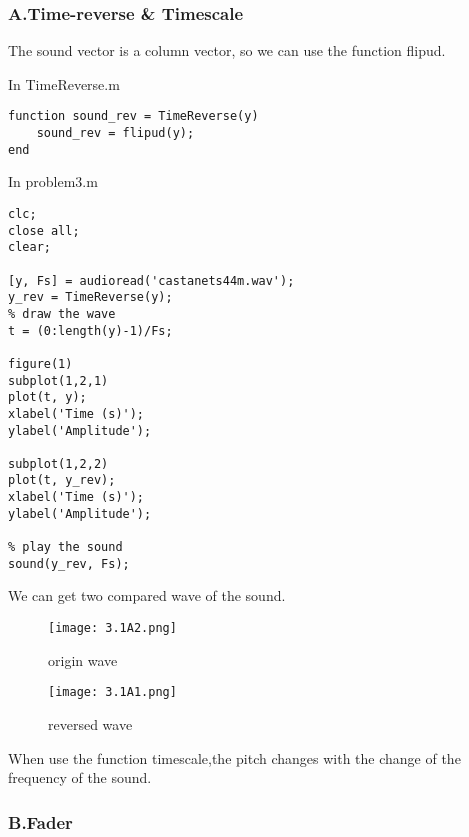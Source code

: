 \documentclass{article}
\begin{document}
\subsubsection*{A.Time-reverse \& Timescale}
The sound vector is a column vector, 
so we can use the function flipud.\par
In TimeReverse.m
\begin{lstlisting}
function sound_rev = TimeReverse(y)
    sound_rev = flipud(y);
end
\end{lstlisting}
In problem3.m
\begin{lstlisting}
clc;
close all;
clear;

[y, Fs] = audioread('castanets44m.wav');
y_rev = TimeReverse(y);
% draw the wave
t = (0:length(y)-1)/Fs;

figure(1)
subplot(1,2,1)
plot(t, y);
xlabel('Time (s)');
ylabel('Amplitude');

subplot(1,2,2)
plot(t, y_rev);
xlabel('Time (s)');
ylabel('Amplitude');

% play the sound
sound(y_rev, Fs);
\end{lstlisting} 

\newpage
We can get two compared wave of the sound.
\begin{figure}[h]
    \begin{minipage}{0.45\textwidth}
        \centering
        \texttt{[image: 3.1A2.png]}
        \caption{origin wave}
    \end{minipage}
    \begin{minipage}{0.45\textwidth}
        \centering
        \texttt{[image: 3.1A1.png]}
        \caption{reversed wave}
    \end{minipage}
\end{figure}

\par
When use the function timescale,the pitch changes with the change of the frequency of the sound.

\subsubsection*{B.Fader}
\end{document}
